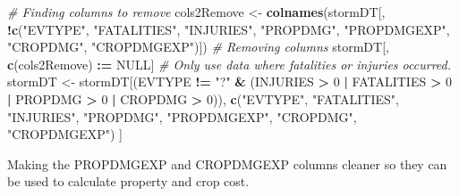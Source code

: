\documentclass[]{article}
\newenvironment{Shaded}{\begin{snugshade}}{\end{snugshade}}
\newcommand{\KeywordTok}[1]{\textcolor[rgb]{0.13,0.29,0.53}{\textbf{#1}}}
\newcommand{\DecValTok}[1]{\textcolor[rgb]{0.00,0.00,0.81}{#1}}
\newcommand{\StringTok}[1]{\textcolor[rgb]{0.31,0.60,0.02}{#1}}
\newcommand{\CommentTok}[1]{\textcolor[rgb]{0.56,0.35,0.01}{\textit{#1}}}
\newcommand{\OtherTok}[1]{\textcolor[rgb]{0.56,0.35,0.01}{#1}}
\newcommand{\OperatorTok}[1]{\textcolor[rgb]{0.81,0.36,0.00}{\textbf{#1}}}
\newcommand{\ErrorTok}[1]{\textcolor[rgb]{0.64,0.00,0.00}{\textbf{#1}}}
\newcommand{\NormalTok}[1]{#1}
\begin{document}
\begin{Shaded}
\begin{Highlighting}[]
\CommentTok{# Finding columns to remove}
\NormalTok{cols2Remove <-}\StringTok{ }\KeywordTok{colnames}\NormalTok{(stormDT[, }\OperatorTok{!}\KeywordTok{c}\NormalTok{(}\StringTok{"EVTYPE"}\NormalTok{, }\StringTok{"FATALITIES"}\NormalTok{, }\StringTok{"INJURIES"}\NormalTok{, }\StringTok{"PROPDMG"}\NormalTok{, }\StringTok{"PROPDMGEXP"}\NormalTok{, }\StringTok{"CROPDMG"}\NormalTok{, }\StringTok{"CROPDMGEXP"}\NormalTok{)])}
\CommentTok{# Removing columns}
\NormalTok{stormDT[, }\KeywordTok{c}\NormalTok{(cols2Remove) }\OperatorTok{:}\ErrorTok{=}\StringTok{ }\OtherTok{NULL}\NormalTok{]}
\CommentTok{# Only use data where fatalities or injuries occurred.  }
\NormalTok{stormDT <-}\StringTok{ }\NormalTok{stormDT[(EVTYPE }\OperatorTok{!=}\StringTok{ "?"} \OperatorTok{&}\StringTok{ }
\StringTok{             }\NormalTok{(INJURIES }\OperatorTok{>}\StringTok{ }\DecValTok{0} \OperatorTok{|}\StringTok{ }\NormalTok{FATALITIES }\OperatorTok{>}\StringTok{ }\DecValTok{0} \OperatorTok{|}\StringTok{ }\NormalTok{PROPDMG }\OperatorTok{>}\StringTok{ }\DecValTok{0} \OperatorTok{|}\StringTok{ }\NormalTok{CROPDMG }\OperatorTok{>}\StringTok{ }\DecValTok{0}\NormalTok{)), }\KeywordTok{c}\NormalTok{(}\StringTok{"EVTYPE"}\NormalTok{, }\StringTok{"FATALITIES"}\NormalTok{, }\StringTok{"INJURIES"}\NormalTok{, }\StringTok{"PROPDMG"}\NormalTok{, }\StringTok{"PROPDMGEXP"}\NormalTok{, }\StringTok{"CROPDMG"}\NormalTok{, }\StringTok{"CROPDMGEXP"}\NormalTok{) ]}
\end{Highlighting}
\end{Shaded}

Making the PROPDMGEXP and CROPDMGEXP columns cleaner so they can be used
to calculate property and crop cost.
\end{document}

